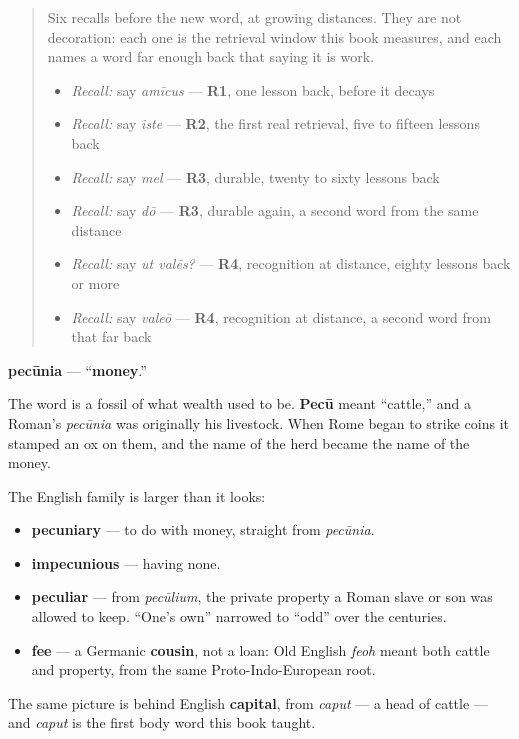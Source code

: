 \begin{quote}
Six recalls before the new word, at growing distances. They are not decoration: each one is the retrieval window this book measures, and each names a word far enough back that saying it is work.

\begin{itemize}
\raggedright
  \item \emph{Recall:} say \emph{amīcus} — \textbf{R1}, one lesson back, before it decays
  \item \emph{Recall:} say \emph{iste} — \textbf{R2}, the first real retrieval, five to fifteen lessons back
  \item \emph{Recall:} say \emph{mel} — \textbf{R3}, durable, twenty to sixty lessons back
  \item \emph{Recall:} say \emph{dō} — \textbf{R3}, durable again, a second word from the same distance
  \item \emph{Recall:} say \emph{ut valēs?} — \textbf{R4}, recognition at distance, eighty lessons back or more
  \item \emph{Recall:} say \emph{valeō} — \textbf{R4}, recognition at distance, a second word from that far back
\end{itemize}
\end{quote}

\begin{cousinweb}
\textbf{pecūnia} — \textquotedblleft{}\textbf{money}.\textquotedblright{}

The word is a fossil of what wealth used to be. \textbf{Pecū} meant \textquotedblleft{}cattle,\textquotedblright{} and a Roman's \emph{pecūnia} was originally his livestock. When Rome began to strike coins it stamped an ox on them, and the name of the herd became the name of the money.

The English family is larger than it looks:

\begin{itemize}
\raggedright
  \item \textbf{pecuniary} — to do with money, straight from \emph{pecūnia}.
  \item \textbf{impecunious} — having none.
  \item \textbf{peculiar} — from \emph{pecūlium}, the private property a Roman slave or son was allowed to keep. \textquotedblleft{}One's own\textquotedblright{} narrowed to \textquotedblleft{}odd\textquotedblright{} over the centuries.
  \item \textbf{fee} — a Germanic \textbf{cousin}, not a loan: Old English \emph{feoh} meant both cattle and property, from the same Proto-Indo-European root.
\end{itemize}

The same picture is behind English \textbf{capital}, from \emph{caput} — a head of cattle — and \emph{caput} is the first body word this book taught.
\end{cousinweb}

